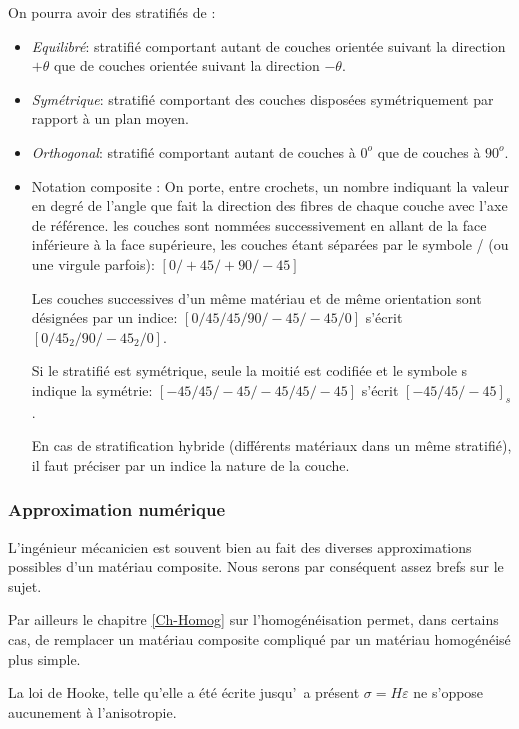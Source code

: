 \medskip
On pourra avoir des stratifiés de :
\begin{itemize}
	\item  \emph{Equilibré}: stratifié comportant autant de couches orientée suivant la direction
		$+\theta$ que de couches orientée suivant la direction $-\theta$.
	\item \emph{Symétrique}: stratifié comportant des couches disposées symétriquement par
		 rapport à un plan moyen.
	\item \emph{Orthogonal}: stratifié comportant autant de couches à $0^o$ que de couches à $90^o$.
	\item Notation \og composite \fg{} :
		On porte, entre crochets, un nombre indiquant la valeur en degré de l'angle que fait la direction 
		des fibres de chaque couche avec l'axe de référence. les couches sont nommées successivement 
		en allant de la face inférieure à la face supérieure, les couches étant séparées par le symbole 
		\og /\fg{} (ou une virgule parfois): $[0/+45/+90/-45]$

		Les couches successives d'un même matériau et de même orientation sont désignées
		par un indice: $[0/45/45/90/-45/-45/0]$ s'écrit $[0/45_2/90/-45_2/0]$.
		
		Si le stratifié est symétrique, seule la moitié est codifiée et le symbole \og s\fg{} indique 
		la symétrie: $[-45/45/-45/-45/45/-45]$ s'écrit $[-45/45/-45]_s$.

		En cas de stratification hybride (différents matériaux dans un même stratifié), il faut
		préciser par un indice la nature de la couche.
\end{itemize}


\medskip
\subsubsection{Approximation numérique}

L'ingénieur mécanicien est souvent bien au fait des diverses approximations possibles d'un 
matériau composite. Nous serons par conséquent assez brefs sur le sujet.

Par ailleurs le chapitre \ref{Ch-Homog} sur l'homogénéisation permet, dans certains cas, de remplacer
un matériau composite compliqué par un matériau homogénéisé plus simple.

\medskip
La loi de Hooke, telle qu'elle a été écrite jusqu'\ a présent $\sigma=H\varepsilon$ ne s'oppose
aucunement à l'anisotropie. 

